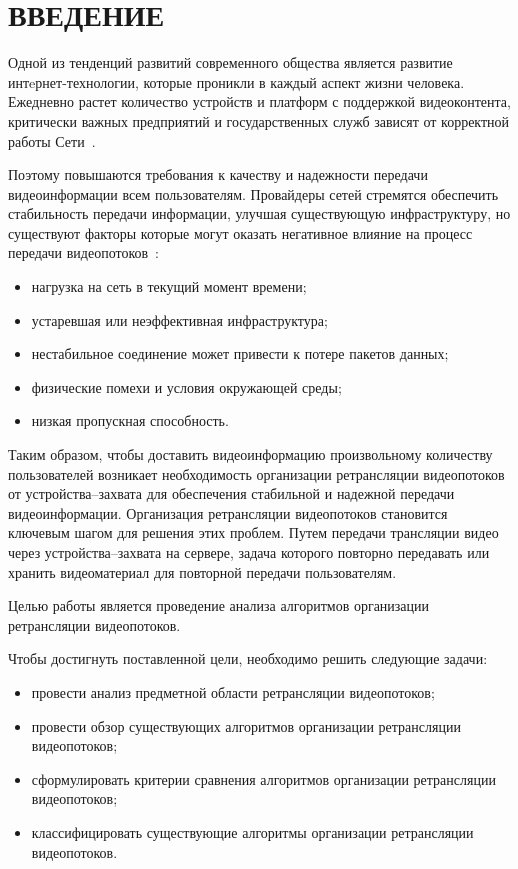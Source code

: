 \chapter*{ВВЕДЕНИЕ}

Одной из тенденций развитий современного общества является развитие интeрнет-технологии, которые проникли в каждый аспект жизни человека.
Ежедневно растет количество устройств и платформ с поддержкой видеоконтента, критически важных предприятий и государственных служб зависят от корректной работы Сети~\cite{mediascope_2022}.

Поэтому повышаются требования к качеству и надежности передачи видеоинформации всем пользователям.
Провайдеры сетей стремятся обеспечить стабильность  передачи информации, улучшая существующую инфраструктуру, но существуют факторы которые могут оказать негативное влияние на процесс передачи видеопотоков~\cite{research_videocontent_2021, research_videocontent_2023}:
\begin{itemize}
	\item нагрузка на сеть в текущий момент времени;
	\item устаревшая или неэффективная инфраструктура;
	\item нестабильное соединение может привести к потере пакетов данных;
	\item физические помехи и условия окружающей среды;
	\item низкая пропускная способность.
\end{itemize}

Таким образом, чтобы доставить видеоинформацию произвольному количеству пользователей возникает необходимость организации ретрансляции видеопотоков от устройства--захвата для обеспечения стабильной и надежной передачи видеоинформации.
Организация ретрансляции видеопотоков становится ключевым шагом для решения этих проблем. Путем передачи трансляции видео через устройства--захвата на сервере, задача которого повторно передавать или хранить видеоматериал для повторной передачи пользователям.

Целью работы является проведение анализа алгоритмов организации ретрансляции видеопотоков.

\clearpage

Чтобы достигнуть поставленной цели, необходимо решить следующие задачи:
\begin{itemize}
	\item провести анализ предметной области ретрансляции видеопотоков;
	\item провести обзор существующих алгоритмов организации ретрансляции видеопотоков;
	\item сформулировать критерии сравнения алгоритмов организации ретрансляции видеопотоков;
	\item классифицировать существующие алгоритмы организации ретрансляции видеопотоков.  
\end{itemize}
